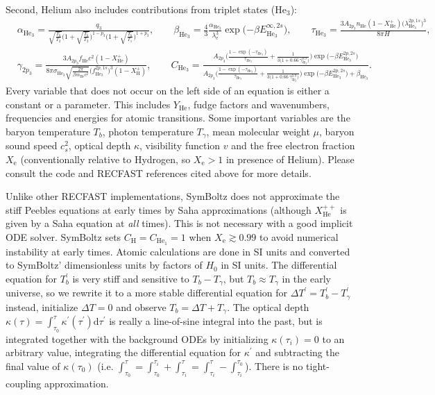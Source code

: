 \documentclass{aa}
\newcommand\el{\mathrm{e}} %
\newcommand\Hy{\mathrm{H}} %
\newcommand\He{\mathrm{He}} %
\newcommand\Hesin{{\mathrm{He}_1}} %
\newcommand\Hetri{{\mathrm{He}_3}} %
\begin{document}
Second, Helium also includes contributions from triplet states ($\Hetri$):
\begin{align*}
&
\alpha_\Hetri = \frac{q_3 }{ \sqrt{\frac{T_b}{T_2}} \Big(1+\sqrt{\frac{T_b}{T_2}}\Big)^{1-p_3} \Big(1+\sqrt{\frac{T_b}{T_1}}\Big)^{1+p_3} }, \qquad
\beta_\Hetri = \frac43 \frac{ \alpha_\Hetri }{ \lambda_\el^3 } \exp\big({-\beta E_\Hetri^{\infty,2s}}\big), \qquad
\tau_\Hetri = \frac{ 3 A_{2p_3} n_\He (1-X_\He^+) \big(\lambda_\Hetri^{2p,1s}\big)^3 }{ 8\pi H }, \\
&
\gamma_{2p_3} = \frac{ 3 A_{2p_3} f_\He c^2 (1-X_\He^+) }{ 8\pi \sigma_{\Hetri} \sqrt{\frac{2 \pi}{\beta m_\He c^2}} \big(f_\Hetri^{2p,1s}\big)^3 (1-X_\Hy^+) }, \qquad
C_\Hetri = \frac{ A_{2p_3} \bigg( \frac{1 - \exp({-\tau_\Hetri}) }{ \tau_\Hetri } + \frac{1}{3\big(1+0.66\,\gamma_{2p_3}^{0.9}\big)} \bigg) \exp\big({-\beta E_\Hetri^{2p,2s}}\big) }{ A_{2p_3} \bigg( \frac{1 - \exp({-\tau_\Hetri}) }{ \tau_\Hetri } + \frac{1}{3\big(1+0.66\,\gamma_{2p_3}^{0.9}\big)} \bigg) \exp\big({-\beta E_\Hetri^{2p,2s}}\big) + \beta_\Hetri } .
\end{align*}
Every variable that does not occur on the left side of an equation is either a constant or a parameter.
This includes $Y_\He$, fudge factors and wavenumbers, frequencies and energies for atomic transitions.
Some important variables are the baryon temperature $T_b$, photon temperature $T_\gamma$, mean molecular weight $\mu$, baryon sound speed $c_s^2$, optical depth $\kappa$, visibility function $v$ and the free electron fraction $X_\el$ (conventionally relative to Hydrogen, so $X_\el > 1$ in presence of Helium).
Please consult the code and RECFAST references cited above for more details.

Unlike other RECFAST implementations, SymBoltz does not approximate the stiff Peebles equations at early times by Saha approximations (although $X_\He^{++}$ is given by a Saha equation at \emph{all} times).
This is not necessary with a good implicit ODE solver.
SymBoltz sets $C_\Hy = C_\Hesin = 1$ when $X_\el \gtrsim 0.99$ to avoid numerical instability at early times.
Atomic calculations are done in SI units and converted to SymBoltz' dimensionless units by factors of $H_0$ in SI units.
The differential equation for $T_b^\prime$ is very stiff and sensitive to $T_b-T_\gamma$, but $T_b \approx T_\gamma$ in the early universe, so we rewrite it to a more stable differential equation for $\Delta T^\prime = T_b^\prime - T_\gamma^\prime$ instead, initialize $\Delta T = 0$ and observe $T_b = \Delta T + T_\gamma$.
The optical depth $\kappa(\tau) = \int_{\tau_0}^\tau \kappa^\prime(\tau^\prime) \mathrm{d}\tau^\prime$ is really a line-of-sine integral into the past,
but is integrated together with the background ODEs by initializing $\kappa(\tau_i) = 0$ to an arbitrary value, integrating the differential equation for $\kappa^\prime$ and subtracting the final value of $\kappa(\tau_0)$ (i.e. $\int_{\tau_0}^{\tau} = \int_{\tau_0}^{\tau_i} + \int_{\tau_i}^{\tau} = \int_{\tau_i}^{\tau} - \int_{\tau_i}^{\tau_0}$).
There is no tight-coupling approximation.
\end{document}
